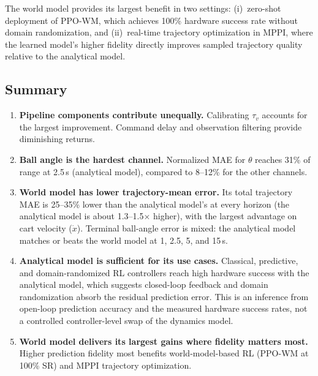 The world model provides its largest benefit in two settings: (i)~zero-shot
deployment of PPO-WM, which achieves 100\% hardware success rate without
domain randomization, and (ii)~real-time trajectory optimization in MPPI,
where the learned model's higher fidelity directly improves sampled
trajectory quality relative to the analytical model.

\subsection{Summary}

\begin{enumerate}
  \item \textbf{Pipeline components contribute unequally.} Calibrating
        $\tau_v$ accounts for the largest improvement.  Command delay
        and observation filtering provide diminishing returns.
  \item \textbf{Ball angle is the hardest channel.} Normalized MAE for
        $\theta$ reaches 31\% of range at 2.5\,s (analytical model),
        compared to 8--12\% for the other channels.
  \item \textbf{World model has lower trajectory-mean error.} Its total
        trajectory MAE is 25--35\% lower than the analytical model's at
        every horizon (the analytical model is about 1.3--1.5$\times$
        higher), with the largest advantage on cart velocity ($\dot{x}$).
        Terminal ball-angle error is mixed: the analytical model matches
        or beats the world model at 1, 2.5, 5, and 15\,s.
  \item \textbf{Analytical model is sufficient for its use cases.}
        Classical, predictive, and domain-randomized RL controllers reach
        high hardware success with the analytical model, which suggests
        closed-loop feedback and domain randomization absorb the residual
        prediction error. This is an inference from open-loop prediction
        accuracy and the measured hardware success rates, not a controlled
        controller-level swap of the dynamics model.
  \item \textbf{World model delivers its largest gains where fidelity
        matters most.} Higher prediction fidelity most benefits
        world-model-based RL (PPO-WM at 100\% SR) and MPPI trajectory
        optimization.
\end{enumerate}
